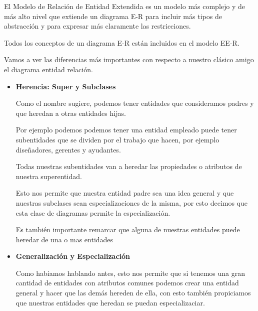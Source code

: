 \documentclass[12pt, fleqn]{report}                             %
\theoremstyle{break}                                            %
\begin{document}
            El Modelo de Relación de Entidad Extendida es un modelo más complejo y de más
            alto nivel que extiende un diagrama E-R para incluir más tipos de abstracción
            y para expresar más claramente las restricciones.

            Todos los conceptos de un diagrama E-R están incluidos en el modelo EE-R.

            Vamos a ver las diferencias más importantes con respecto a nuestro clásico
            amigo el diagrama entidad relación.

        \begin{itemize}
            \item
                \textbf{Herencia: Super y Subclases}

                Como el nombre sugiere, podemos tener entidades que consideramos padres
                y que heredan a otras entidades hijas.

                Por ejemplo podemos podemos tener una entidad empleado puede tener
                subentidades que se dividen por el trabajo que hacen, por ejemplo
                diseñadores, gerentes y ayudantes.

                Todas nuestras subentidades van a heredar las propiedades o atributos
                de nuestra superentidad.

                Esto nos permite que nuestra entidad padre sea una idea general y que
                nuestras subclases sean especializaciones de la misma, por esto decimos
                que esta clase de diagramas permite la especialización.


                Es también importante remarcar que alguna de nuestras entidades
                puede heredar de una o mas entidades


            \item
                \textbf{Generalización y Especialización}

                Como habiamos hablando antes, esto nos permite que si tenemos
                una gran cantidad de entidades con atributos comunes podemos 
                crear una entidad general y hacer que las demás hereden de ella,
                con esto también propiciamos que nuestras entidades que heredan 
                se puedan especializaciar.


            \clearpage


\end{itemize}
\end{document}
